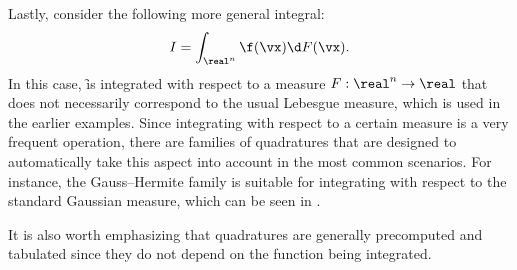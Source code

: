 Lastly, consider the following more general integral:
\[
  I = \int_{\real^n} \f(\vx) \d F(\vx).
\]
In this case, \f is integrated with respect to a measure $F: \real^n \to \real$
\cite{durrett2010} that does not necessarily correspond to the usual Lebesgue
measure, which is used in the earlier examples. Since integrating with respect
to a certain measure is a very frequent operation, there are families of
quadratures that are designed to automatically take this aspect into account in
the most common scenarios. For instance, the Gauss--Hermite family is suitable
for integrating with respect to the standard Gaussian measure, which can be seen
in .

It is also worth emphasizing that quadratures are generally precomputed and
tabulated since they do not depend on the function being integrated.
